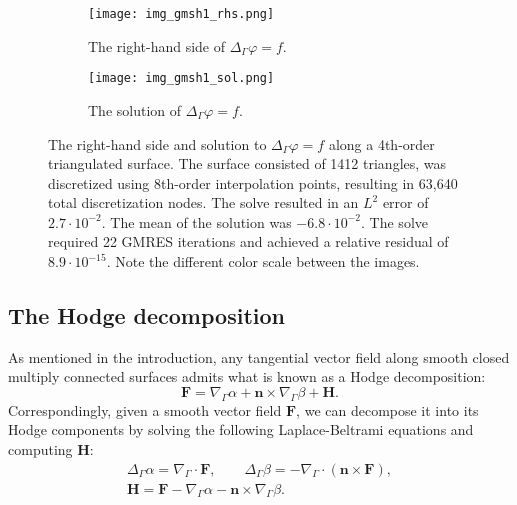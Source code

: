 \documentclass[11pt]{article}
\renewcommand{\phi}{\varphi}
\newcommand{\surfdiv}{\nabla_\Gamma \cdot}
\newcommand{\surfgrad}{\nabla_\Gamma}
\newcommand{\surflap}{\Delta_\Gamma}
\newcommand{\bn}{\bm n}
\newcommand{\bF}{\bm F}
\newcommand{\bH}{\bm H}
\numberwithin{equation}{section}
\begin{document}
\begin{figure}[!t]
  \begin{center}
    \begin{subfigure}[b]{.45\linewidth}
      \centering
      \texttt{[image: img\_gmsh1\_rhs.png]}
      \caption{The right-hand side of $\surflap \phi = f$.}
      \label{fig_gmsh1_rhs}
    \end{subfigure}
    \quad
    \begin{subfigure}[b]{.45\linewidth}
      \centering
      \texttt{[image: img\_gmsh1\_sol.png]}
      \caption{The solution of $\surflap \phi = f$.}
      \label{fig_gmsh1_sol}
    \end{subfigure}
    \caption{The right-hand side and solution to $\surflap \phi = f$
      along a 4th-order triangulated surface. The surface consisted of
      1412 triangles, was discretized using 8th-order interpolation
      points, resulting in 63,640 total discretization nodes. The solve
      resulted in an $L^2$ error of $2.7\cdot 10^{-2}$.
      The mean of the solution
      was $-6.8 \cdot 10^{-2}$.
      The solve required 22 GMRES iterations and achieved a
      relative residual of $8.9 \cdot 10^{-15}$.
      Note the different color scale between the images.}
    \label{fig_gmsh1}
  \end{center}
\end{figure}



\subsection{The Hodge decomposition}

As mentioned in the introduction, any tangential vector field along
smooth closed multiply connected surfaces admits what is known as a Hodge
decomposition:
\begin{equation}
\bF = \surfgrad \alpha  + \bn \times \surfgrad \beta  + \bH.
\end{equation}
Correspondingly, given a smooth vector field $\bF$, we can
decompose it into its Hodge
components by solving the following Laplace-Beltrami equations and
computing $\bH$:
\begin{equation}\label{eq_hodgesystem}
\begin{gathered}
\surflap \alpha = \surfdiv \bF, \qquad \surflap \beta = -\surfdiv (\bn
\times \bF), \\
\bH = \bF - \surfgrad \alpha - \bn \times \surfgrad \beta.
\end{gathered}
\end{equation}
\end{document}
